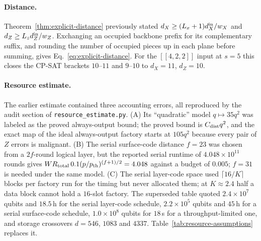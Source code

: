 \documentclass[aps,prx,reprint,superscriptaddress,nofootinbib,floatfix,longbibliography]{revtex4-2}
\theoremstyle{definition}
\begin{document}
\paragraph{Distance.}
Theorem~\ref{thm:explicit-distance} previously stated
$d_X\ge(L_x+1)d_X^{\rm in}/w_X$ and $d_Z\ge L_zd_Z^{\rm in}/w_Z$.  Exchanging an
occupied backbone prefix for its complementary suffix, and rounding the
number of occupied pieces up in each plane before summing, gives
Eq.~\eqref{eq:explicit-distance}.  For the $[[4,2,2]]$ input at $s=5$ this
closes the CP-SAT brackets $10$--$11$ and $9$--$10$ to $d_X=11$, $d_Z=10$.

\paragraph{Resource estimate.}
The earlier estimate contained three accounting errors, all reproduced by the
audit section of \texttt{resource\_estimate.py}.  (A) Its ``quadratic'' model
$q\mapsto35q^2$ was labeled as the proved always-output bound; the proved
bound is $C_{\rm dist}q^2$, and the exact map of the ideal always-output
factory starts at $105q^2$ because every pair of $Z$ errors is malignant.
(B) The serial surface-code distance $f=23$ was chosen from a $2f$-round
logical layer, but the reported serial runtime of $4.048\times10^{11}$ rounds
gives $WR_{\rm total}\,0.1(p/p_{\rm th})^{(f+1)/2}=4.048$ against a budget of
$0.005$; $f=31$ is needed under the same model.  (C) The serial layer-code
space used $\lceil16/K\rceil$ blocks per factory run for the timing but never
allocated them; at $K\approx2.4$ half a data block cannot hold a $16$-slot
factory.  The superseded table quoted $2.4\times10^7$ qubits and $18.5$\,h for
the serial layer-code schedule, $2.2\times10^5$ qubits and $45$\,h for a serial
surface-code schedule, $1.0\times10^8$ qubits for $18$\,s for a
throughput-limited one, and storage crossovers $d=546$, $1083$ and $4337$.
Table~\ref{tab:resource-assumptions} replaces it.
\end{document}
